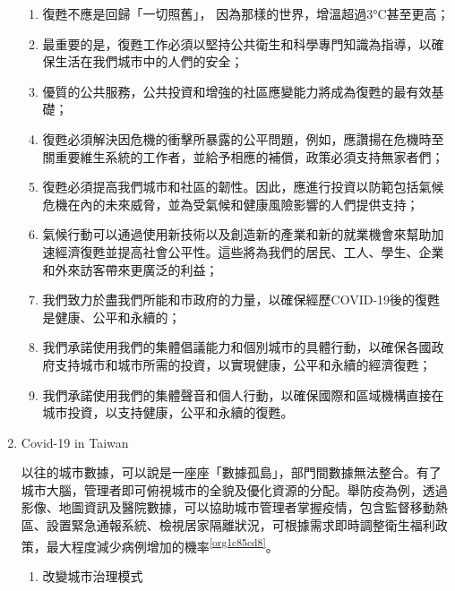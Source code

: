 \documentclass[a4paper,12pt]{article}
\begin{document}
\begin{enumerate}
\begin{enumerate}
\item 復甦不應是回歸「一切照舊」， 因為那樣的世界，增溫超過3°C甚至更高；\\
\item 最重要的是，復甦工作必須以堅持公共衛生和科學專門知識為指導，以確保生活在我們城市中的人們的安全；\\
\item 優質的公共服務，公共投資和增強的社區應變能力將成為復甦的最有效基礎；\\
\item 復甦必須解決因危機的衝擊所暴露的公平問題，例如，應讚揚在危機時至關重要維生系統的工作者，並給予相應的補償，政策必須支持無家者們；\\
\item 復甦必須提高我們城市和社區的韌性。因此，應進行投資以防範包括氣候危機在內的未來威脅，並為受氣候和健康風險影響的人們提供支持；\\
\item 氣候行動可以通過使用新技術以及創造新的產業和新的就業機會來幫助加速經濟復甦並提高社會公平性。這些將為我們的居民、工人、學生、企業和外來訪客帶來更廣泛的利益；\\
\item 我們致力於盡我們所能和市政府的力量，以確保經歷COVID-19後的復甦是健康、公平和永續的；\\
\item 我們承諾使用我們的集體倡議能力和個別城市的具體行動，以確保各國政府支持城市和城市所需的投資，以實現健康，公平和永續的經濟復甦；\\
\item 我們承諾使用我們的集體聲音和個人行動，以確保國際和區域機構直接在城市投資，以支持健康，公平和永續的復甦。\\
\end{enumerate}

\item Covid-19 in Taiwan
\label{sec:orgc14249e}

以往的城市數據，可以說是一座座「數據孤島」，部門間數據無法整合。有了城市大腦，管理者即可俯視城市的全貌及優化資源的分配。舉防疫為例，透過影像、地圖資訊及醫院數據，可以協助城市管理者掌握疫情，包含監督移動熱區、設置緊急通報系統、檢視居家隔離狀況，可根據需求即時調整衛生福利政策，最大程度減少病例增加的機率\textsuperscript{\ref{org1c85cd8}}。\\
\begin{enumerate}
\item 改變城市治理模式
\label{sec:org4882b6c}


\end{enumerate}
\end{enumerate}
\end{document}
